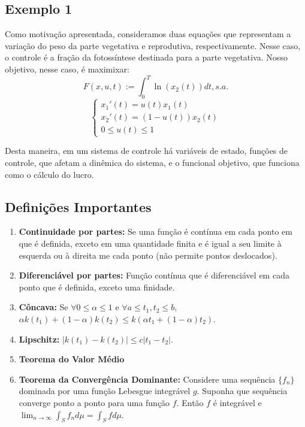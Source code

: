 \subsection*{Exemplo 1}

Como motivação apresentada, consideramos duas equações que representam a variação do peso da parte vegetativa e reprodutiva, respectivamente. Nesse caso, o controle é a fração da fotossíntese destinada para a parte vegetativa. Nosso objetivo, nesse caso, é maximixar: 
\begin{equation*}
F(x,u,t) := \int_0^T \ln(x_2(t))dt, s.a. 
\end{equation*} 
\begin{equation*}
\begin{cases}
x_1'(t) = u(t)x_1(t) \\
x_2'(t) = (1 - u(t))x_2(t) \\
0 \leq u(t) \leq 1
\end{cases}    
\end{equation*}

Desta maneira, em um sistema de controle há variáveis de estado, funções de controle, que afetam a dinêmica do sistema, e o funcional objetivo, que funciona como o cálculo do lucro. 

\subsection{Definições Importantes}
\begin{enumerate}
    \item \textbf{Continuidade por partes:} Se uma função é contínua em cada ponto em que é definida, exceto em uma quantidade finita e é igual a seu limite à esquerda ou à direita me cada ponto (não permite pontos deslocados). 
    \item \textbf{Diferenciável por partes:} Função contínua que é diferenciável em cada ponto que é definida, exceto uma finidade.
    \item \textbf{Côncava: } Se $\forall 0 \leq \alpha \leq 1$ e $\forall a \leq t_1,t_2 \leq b$, $\alpha k(t_1) + (1 - \alpha)k(t_2) \leq k(\alpha t_1 + (1 - \alpha)t_2)$.
    \item \textbf{Lipschitz: } $|k(t_1) - k(t_2)| \leq c|t_1 - t_2|$.
    \item \textbf{Teorema do Valor Médio}
    \item \textbf{Teorema da Convergência Dominante: } Considere uma sequência $\{f_n\}$ dominada por uma função Lebesgue integrável $g$. Suponha que sequência converge ponto a ponto para uma função $f$. Então $f$ é integrável e $\lim_{n \to \infty} \int_S f_n d\mu = \int_S f d\mu$.
\end{enumerate}

